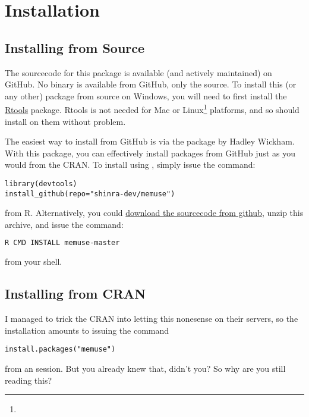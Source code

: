\section{Installation}

\subsection{Installing from Source}

The sourcecode for this package is available (and actively maintained) on 
GitHub.  No binary is available from GitHub, only the source.  To install this 
(or any other) package from source on Windows, you will need to first install 
the \href{http://cran.r-project.org/bin/windows/Rtools/Rtools216.exe}{Rtools} 
package.  Rtools is not needed for Mac or Linux\footnote{\interject} 
platforms, and so  should install on them without problem.

The easiest way to install  from GitHub is via the \href{http://cran.r-project.org/web/packages/devtools/index.html}{} package by Hadley Wickham.  With this package, you can effectively install packages from GitHub just as you would from the CRAN.  To install  using , simply issue the command:
\begin{lstlisting}[language=rr]
library(devtools)
install_github(repo="shinra-dev/memuse")
\end{lstlisting}
from R.  Alternatively, you could  
\href{https://github.com/shinra-dev/memuse/archive/master.zip}{download the 
sourcecode from github}, unzip this archive, and issue the command:
\begin{lstlisting}[language=sh]
R CMD INSTALL memuse-master
\end{lstlisting}
from your shell.


\subsection{Installing from CRAN}

I managed to trick the CRAN into letting this nonesense on their servers, 
so the installation amounts to issuing the command
\begin{lstlisting}[language=rr]
install.packages("memuse")
\end{lstlisting}
from an \R session.  But you already knew that, didn't you?  So why are you 
still reading this?
